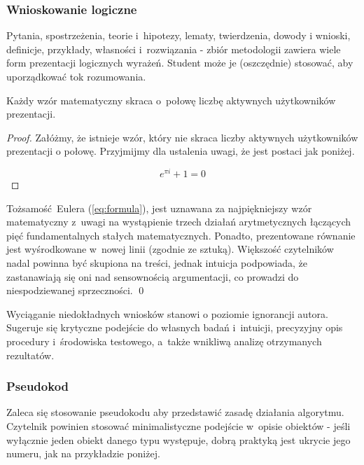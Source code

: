 \subsubsection{Wnioskowanie logiczne}
\label{subsubsec:logic}

Pytania, spostrzeżenia, teorie i~hipotezy, lematy, twierdzenia, dowody i wnioski, definicje, przykłady, własności i~rozwiązania - zbiór metodologii zawiera wiele form prezentacji logicznych wyrażeń. Student może je (oszczędnie) stosować, aby uporządkować tok rozumowania.

\begin{claim}
	Każdy wzór matematyczny skraca o~połowę liczbę aktywnych użytkowników prezentacji.
\end{claim}
\begin{proof}
	Załóżmy, że istnieje wzór, który nie skraca liczby aktywnych użytkowników prezentacji o połowę. Przyjmijmy dla ustalenia uwagi, że jest postaci jak poniżej.

	\begin{equation} \label{eq:formula}
	e^{\pi i} + 1 = 0
	\end{equation}
\end{proof}

\noindent Tożsamość Eulera (\ref{eq:formula}), jest uznawana za najpiękniejszy wzór matematyczny z~uwagi na wystąpienie trzech działań arytmetycznych łączących pięć fundamentalnych stałych matematycznych. Ponadto, prezentowane równanie jest wyśrodkowane w~nowej linii (zgodnie ze sztuką). Większość czytelników nadal powinna być skupiona na treści, jednak intuicja podpowiada, że zastanawiają się oni nad sensownością argumentacji, co prowadzi do niespodziewanej sprzeczności. \qed

Wyciąganie niedokładnych wniosków stanowi o poziomie ignorancji autora. Sugeruje się krytyczne podejście do własnych badań i~intuicji, precyzyjny opis procedury i~środowiska testowego, a~także wnikliwą analizę otrzymanych rezultatów.

\subsubsection{Pseudokod}
\label{subsubsec:pseudocode}

Zaleca się stosowanie pseudokodu aby przedstawić zasadę działania algorytmu. Czytelnik powinien stosować minimalistyczne podejście w~opisie obiektów - jeśli wyłącznie jeden obiekt danego typu występuje, dobrą praktyką jest ukrycie jego numeru, jak na przykładzie poniżej.

